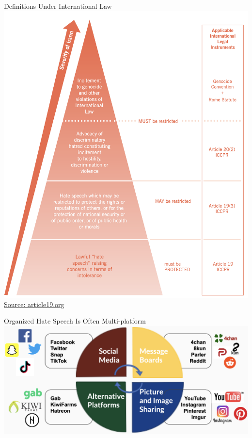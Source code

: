 \documentclass[nobackground,dvipsnames,table,aspectratio=169]{beamer}
\begin{document}
\begin{frame}{Definitions Under International Law}
    \centering
    \includegraphics[height=0.8\textheight]{hate-speech-pyramid}
    \tiny
    \underline{\href{https://www.article19.org/data/files/medialibrary/38231/'Hate-Speech'-Explained---A-Toolkit-\%282015-Edition\%29.pdf}{Source: article19.org}}
\end{frame}

\begin{frame}{Organized Hate Speech Is Often Multi-platform}
    \includegraphics[width=\textwidth]{multiplatform-hate-speech}
\end{frame}
\end{document}
